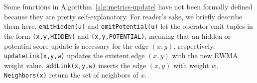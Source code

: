 Some functions in Algorithm~\ref{alg:metrics-update} have not been formally defined because they are pretty self-explanatory. For reader's sake, we briefly describe them here. \texttt{emitHidden(u)} and \texttt{emitPotential(u)} let the operator emit tuples in the form \texttt{(x,y,HIDDEN)} and \texttt{(x,y,POTENTIAL)}, meaning that an hidden or potential score update is necessary for the edge $(x,y)$, respectively.
\texttt{updateLink(x,y,w)} updates the existent edge $(x,y)$ with the new EWMA weight value. 
\texttt{addLink(x,y,w)} inserts the edge $(x,y)$ with weight $w$. 
\texttt{Neighbors(x)} return the set of neighbors of $x$.
